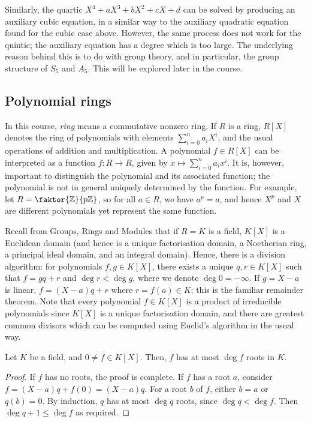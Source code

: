Similarly, the quartic \( X^4 + aX^3 + bX^2 + cX + d \) can be solved by producing an auxiliary cubic equation, in a similar way to the auxiliary quadratic equation found for the cubic case above.
However, the same process does not work for the quintic; the auxiliary equation has a degree which is too large.
The underlying reason behind this is to do with group theory, and in particular, the group structure of \( S_5 \) and \( A_5 \).
This will be explored later in the course.

\subsection{Polynomial rings}
In this course, \emph{ring} means a commutative nonzero ring.
If \( R \) is a ring, \( R[X] \) denotes the ring of polynomials with elements \( \sum_{i=0}^n a_i X^i \), and the usual operations of addition and multiplication.
A polynomial \( f \in R[X] \) can be interpreted as a function \( f \colon R \to R \), given by \( x \mapsto \sum_{i=0}^n a_i x^i \).
It is, however, important to distinguish the polynomial and its associated function; the polynomial is not in general uniquely determined by the function.
For example, let \( R = \faktor{\mathbb Z}{p\mathbb Z} \), so for all \( a \in R \), we have \( a^p = a \), and hence \( X^p \) and \( X \) are different polynomials yet represent the same function.

Recall from Groups, Rings and Modules that if \( R = K \) is a field, \( K[X] \) is a Euclidean domain (and hence is a unique factorisation domain, a Noetherian ring, a principal ideal domain, and an integral domain).
Hence, there is a division algorithm: for polynomials \( f, g \in K[X] \), there exists a unique \( q, r \in K[X] \) such that \( f = gq + r \) and \( \deg r < \deg g \), where we denote \( \deg 0 = -\infty \).
If \( g = X - a \) is linear, \( f = (X-a)q + r \) where \( r = f(a) \in K \); this is the familiar remainder theorem.
Note that every polynomial \( f \in K[X] \) is a product of irreducible polynomials since \( K[X] \) is a unique factorisation domain, and there are greatest common divisors which can be computed using Euclid's algorithm in the usual way.

\begin{proposition}
	Let \( K \) be a field, and \( 0 \neq f \in K[X] \).
	Then, \( f \) has at most \( \deg f \) roots in \( K \).
\end{proposition}
\begin{proof}
	If \( f \) has no roots, the proof is complete.
	If \( f \) has a root \( a \), consider \( f = (X - a)q + f(0) = (X - a)q \).
	For a root \( b \) of \( f \), either \( b = a \) or \( q(b) = 0 \).
	By induction, \( q \) has at most \( \deg q \) roots, since \( \deg q < \deg f \).
	Then \( \deg q + 1 \leq \deg f \) as required.
\end{proof}

